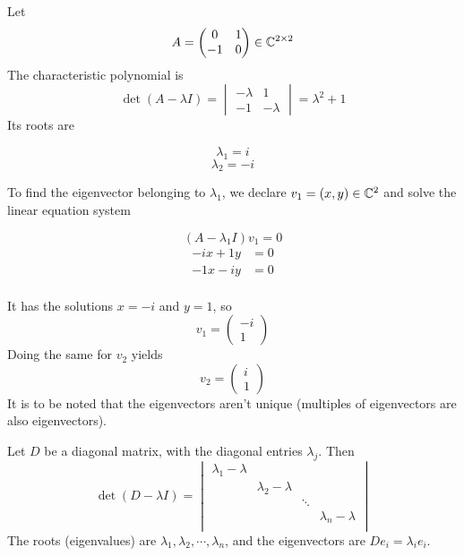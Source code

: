\documentclass[../../script.tex]{subfiles}
\begin{document}
\begin{eg}
    Let 
    \[
        A = \begin{pmatrix}
            0 & 1 \\ -1 & 0
        \end{pmatrix}
        \in \mathbb{C}^{2 \times 2}
    \]
    The characteristic polynomial is
    \[
        \det(A - \lambda I) = \begin{vmatrix}
            -\lambda & 1 \\ -1 & -\lambda
        \end{vmatrix}
        = \lambda^2 + 1
    \]
    Its roots are 
    \begin{multicols}{2}
        \noindent
        \[ \lambda_1 = i \]
        \[ \lambda_2 = -i \]
    \end{multicols}
    \noindent To find the eigenvector belonging to $\lambda_1$, we declare $v_1 = (x, y) \in \mathbb{C}^2$ and solve the linear equation system 
    \begin{multicols}{2}\noindent
        \[ (A - \lambda_1 I) v_1 = 0 \]
        \begin{align*}
            -ix + 1y &= 0 \\
            -1x - iy &= 0 \\
        \end{align*}
    \end{multicols}
    \noindent It has the solutions $x = -i$ and $y = 1$, so 
    \[
        v_1 = \begin{pmatrix}
            -i \\ 1
        \end{pmatrix}
    \]
    Doing the same for $v_2$ yields 
    \[
        v_2 = \begin{pmatrix}
            i \\ 1
        \end{pmatrix}    
    \]
    It is to be noted that the eigenvectors aren't unique (multiples of eigenvectors are also eigenvectors).
\end{eg}

\begin{eg}
    Let $D$ be a diagonal matrix, with the diagonal entries $\lambda_j$. Then 
    \[
        \det(D - \lambda I) = \begin{vmatrix}
            \lambda_1 - \lambda & & & \\
            & \lambda_2 - \lambda & & \\
            & & \ddots & \\
            & & & \lambda_n - \lambda \\
        \end{vmatrix}
    \]
    The roots (eigenvalues) are $\lambda_1, \lambda_2, \cdots, \lambda_n$, and the eigenvectors are $De_i = \lambda_i e_i$.
\end{eg}
\end{document}
